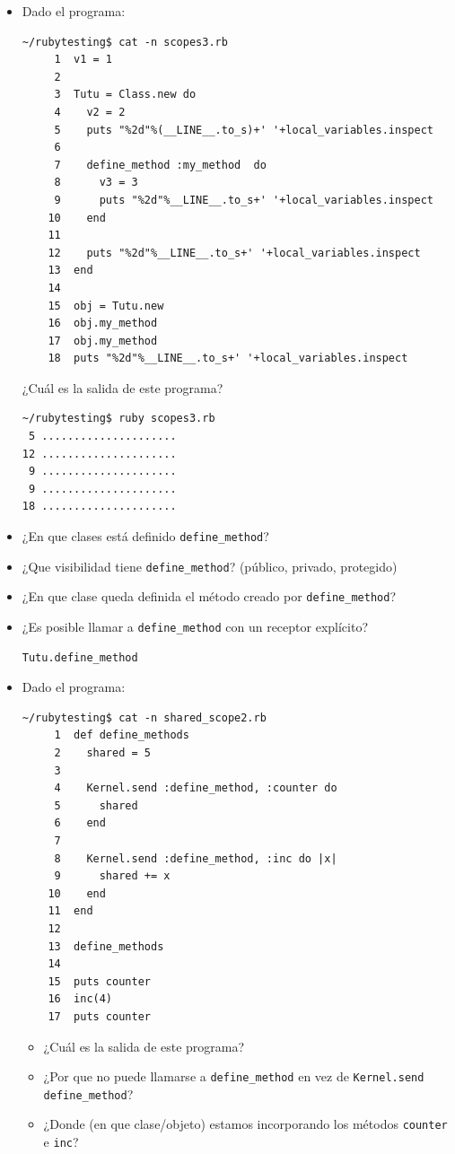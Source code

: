 \begin{itemize}
\item Dado el programa:
\begin{verbatim}
~/rubytesting$ cat -n scopes3.rb 
     1  v1 = 1                  
     2  
     3  Tutu = Class.new do
     4    v2 = 2                
     5    puts "%2d"%(__LINE__.to_s)+' '+local_variables.inspect    
     6  
     7    define_method :my_method  do
     8      v3 = 3
     9      puts "%2d"%__LINE__.to_s+' '+local_variables.inspect
    10    end
    11  
    12    puts "%2d"%__LINE__.to_s+' '+local_variables.inspect    
    13  end
    14  
    15  obj = Tutu.new
    16  obj.my_method        
    17  obj.my_method        
    18  puts "%2d"%__LINE__.to_s+' '+local_variables.inspect      
\end{verbatim}
¿Cuál es la salida de este programa?
\begin{verbatim}
~/rubytesting$ ruby scopes3.rb 
 5 .....................
12 .....................
 9 .....................
 9 .....................
18 .....................
\end{verbatim}
\item ¿En que clases está definido \verb|define_method|?
\item ¿Que visibilidad tiene \verb|define_method|? (público, privado, protegido) 
\item ¿En que clase queda definida el método creado por \verb|define_method|?
\item ¿Es posible llamar a \verb|define_method| con un receptor explícito?
\begin{verbatim}
Tutu.define_method
\end{verbatim}
\item Dado el programa:
\begin{verbatim}
~/rubytesting$ cat -n shared_scope2.rb 
     1  def define_methods
     2    shared = 5
     3    
     4    Kernel.send :define_method, :counter do
     5      shared
     6    end
     7  
     8    Kernel.send :define_method, :inc do |x|
     9      shared += x
    10    end
    11  end
    12  
    13  define_methods
    14  
    15  puts counter     
    16  inc(4)
    17  puts counter      
\end{verbatim}
\begin{itemize}
\item
¿Cuál es la salida de este programa?
\item
¿Por que no puede llamarse a \verb|define_method| en vez de \verb|Kernel.send define_method|?
\item
¿Donde (en que clase/objeto) estamos incorporando los métodos \verb|counter| e \verb|inc|?

\end{itemize}
\end{itemize}
